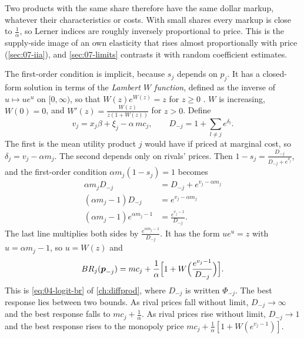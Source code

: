 Two products with the same share therefore have the same dollar markup, whatever their characteristics or costs.
With small shares every markup is close to $\frac{1}{\alpha}$, so Lerner indices are roughly inversely proportional to
price. This is the supply-side image of an own elasticity that rises almost proportionally with price
(\cref{sec:07-iia}), and \cref{sec:07-limits} contrasts it with random coefficient estimates.

The first-order condition is implicit, because $s_j$ depends on $p_j$. It has a closed-form solution in terms of the
\emph{Lambert $W$ function}, defined as the inverse of $u \mapsto ue^u$ on $[0, \infty)$, so that $W(z)e^{W(z)} = z$
for $z \ge 0$ \citep{CorlessEtAl1996}. $W$ is increasing, $W(0) = 0$, and $W'(z) = \frac{W(z)}{z(1 + W(z))}$ for $z >
0$. Define
\begin{equation*}
  v_j = x_j\beta + \xi_j - \alpha\,mc_j, \qquad D_{-j} = 1 + \sum_{l \neq j} e^{\delta_l}.
\end{equation*}
The first is the mean utility product $j$ would have if priced at marginal cost, so $\delta_j = v_j - \alpha m_j$. The
second depends only on rivals' prices. Then $1 - s_j = \frac{D_{-j}}{D_{-j} + e^{\delta_j}}$, and the first-order
condition $\alpha m_j (1 - s_j) = 1$ becomes
\begin{align*}
  \alpha m_j D_{-j} &= D_{-j} + e^{v_j - \alpha m_j} \\
  (\alpha m_j - 1) D_{-j} &= e^{v_j - \alpha m_j} \\
  (\alpha m_j - 1)e^{\alpha m_j - 1} &= \frac{e^{v_j - 1}}{D_{-j}} .
\end{align*}
The last line multiplies both sides by $\frac{e^{\alpha m_j - 1}}{D_{-j}}$. It has the form $ue^u = z$ with $u = \alpha
m_j - 1$, so $u = W(z)$ and
\begin{equation}\label{eq:07-br-lambert}
  BR_j(\boldsymbol p_{-j}) = mc_j + \frac{1}{\alpha}\Bigl[1 + W\Bigl(\frac{e^{v_j - 1}}{D_{-j}}\Bigr)\Bigr].
\end{equation}
This is \eqref{eq:04-logit-br} of \cref{ch:diffprod}, where $D_{-j}$ is written $\Phi_{-j}$. The best response lies
between two bounds. As rival prices fall without limit, $D_{-j} \to \infty$ and the best
response falls to $mc_j + \frac{1}{\alpha}$. As rival prices rise without limit, $D_{-j} \to 1$ and the best response
rises to the monopoly price $mc_j + \frac{1}{\alpha}[1 + W(e^{v_j - 1})]$.

